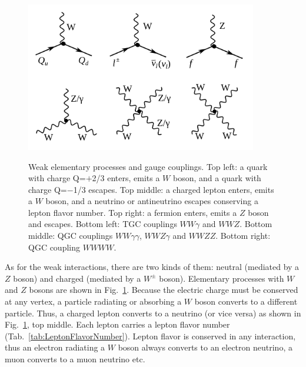 \begin{figure}[htb]
  \begin{center}
    {\includegraphics[width=0.90\textwidth]{../figs/Intro/feynmW.png}}
    \caption{Weak elementary processes and gauge couplings. Top left: a quark with charge Q=$+$2/3 enters, emits a $W$ boson, and a quark with charge Q=$-$1/3 escapes. Top middle: a charged lepton enters, emits a $W$ boson, and a neutrino or antineutrino escapes conserving a lepton flavor number. Top right: a fermion enters, emits a $Z$ boson and escapes. Bottom left: TGC couplings $WW\gamma$ and $WWZ$. Bottom middle: QGC couplings $WW\gamma\gamma$, $WWZ\gamma$ and $WWZZ$. Bottom right: QGC coupling $WWWW$.}
    \label{fig:feynmW}
  \end{center}
\end{figure}

As for the weak interactions, there are two kinds of them: neutral (mediated by a $Z$ boson) and charged (mediated by a $W^\pm$ boson). Elementary processes with $W$ and $Z$ bosons are shown in Fig.~\ref{fig:feynmW}. Because the electric charge must be conserved at any vertex, a particle radiating or absorbing a $W$ boson converts to a different particle. Thus, a charged lepton converts to a neutrino (or vice versa) as shown in Fig.~\ref{fig:feynmW}, top middle. Each lepton carries a lepton flavor number (Tab.~\ref{tab:LeptonFlavorNumber}). Lepton flavor is conserved in any interaction, thus an electron radiating a $W$ boson  always converts to an electron neutrino, a muon converts to a muon neutrino etc.\\

